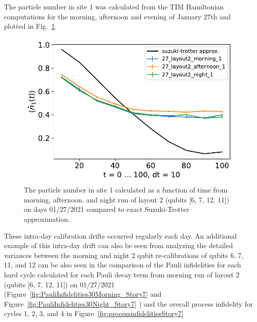 The particle number in site 1 was calculated from the TIM Hamiltonian computations for the morning, afternoon and evening of January 27th and plotted in Fig.~\ref{fig:n1_Story6}.


\begin{figure}[ht!]
    \includegraphics[scale=0.55]{TIM_[27]_[layout2]_[morning, afternoon, night]_n1.pdf}
    \caption{The particle number in site 1 calculated as a function of time from morning, afternoon. and night run of layout 2 (qubits [6, 7, 12, 11]) on days 01/27/2021 compared to exact Suzuki-Trotter approximation.}
    \label{fig:n1_Story6}
\end{figure}

These intra-day calibration drifts occurred regularly each day.  An additional example of this intra-day drift can also be seen from analyzing the detailed variances between the morning and night 2 qubit re-calibrations of qubits 6, 7, 11, and 12 can be also seen in the comparison of the Pauli infidelities for each hard cycle calculated for each Pauli decay term from morning run of layout 2 (qubits [6, 7, 12, 11]) on 01/27/2021 (Figure~\ref{fig:PauliInfidelities30Morning_Story7} and Figure~\ref{fig:PauliInfidelities30Night_Story7} ) 
and the overall process infidelity for cycles 1, 2, 3, and 4 in 
Figure~\ref{fig:processinfidelitiesStory7}



